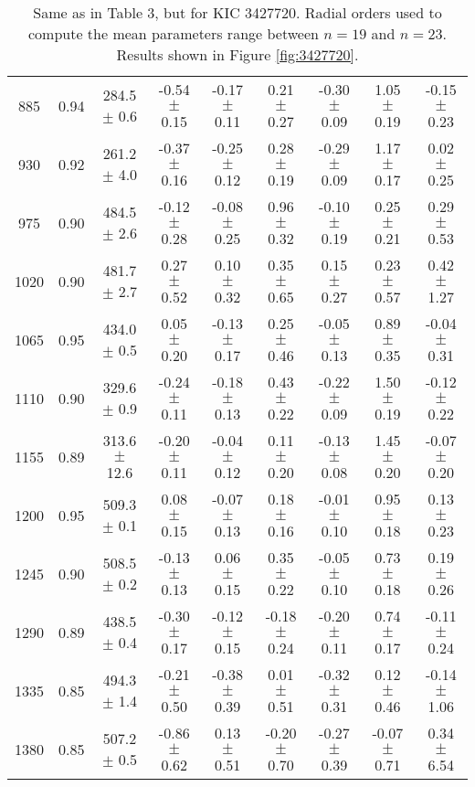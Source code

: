 \documentclass[twocolumn]{aastex61}%
\begin{document}
\begin{table*}[ht]
\begin{tabular}{ccc|ccccc|c}
885 & 0.94 & 284.5 $\pm$ 0.6 & -0.54 $\pm$ 0.15 & -0.17 $\pm$ 0.11 & 0.21 $\pm$ 0.27 & -0.30 $\pm$ 0.09 & 1.05 $\pm$ 0.19 & -0.15 $\pm$ 0.23\\
930 & 0.92 & 261.2 $\pm$ 4.0 & -0.37 $\pm$ 0.16 & -0.25 $\pm$ 0.12 & 0.28 $\pm$ 0.19 & -0.29 $\pm$ 0.09 & 1.17 $\pm$ 0.17 & 0.02 $\pm$ 0.25\\
975 & 0.90 & 484.5 $\pm$ 2.6 & -0.12 $\pm$ 0.28 & -0.08 $\pm$ 0.25 & 0.96 $\pm$ 0.32 & -0.10 $\pm$ 0.19 & 0.25 $\pm$ 0.21 & 0.29 $\pm$ 0.53\\
1020 & 0.90 & 481.7 $\pm$ 2.7 & 0.27 $\pm$ 0.52 & 0.10 $\pm$ 0.32 & 0.35 $\pm$ 0.65 & 0.15 $\pm$ 0.27 & 0.23 $\pm$ 0.57 & 0.42 $\pm$ 1.27\\
1065 & 0.95 & 434.0 $\pm$ 0.5 & 0.05 $\pm$ 0.20 & -0.13 $\pm$ 0.17 & 0.25 $\pm$ 0.46 & -0.05 $\pm$ 0.13 & 0.89 $\pm$ 0.35 & -0.04 $\pm$ 0.31\\
1110 & 0.90 & 329.6 $\pm$ 0.9 & -0.24 $\pm$ 0.11 & -0.18 $\pm$ 0.13 & 0.43 $\pm$ 0.22 & -0.22 $\pm$ 0.09 & 1.50 $\pm$ 0.19 & -0.12 $\pm$ 0.22\\
1155 & 0.89 & 313.6 $\pm$ 12.6 & -0.20 $\pm$ 0.11 & -0.04 $\pm$ 0.12 & 0.11 $\pm$ 0.20 & -0.13 $\pm$ 0.08 & 1.45 $\pm$ 0.20 & -0.07 $\pm$ 0.20\\
1200 & 0.95 & 509.3 $\pm$ 0.1 & 0.08 $\pm$ 0.15 & -0.07 $\pm$ 0.13 & 0.18 $\pm$ 0.16 & -0.01 $\pm$ 0.10 & 0.95 $\pm$ 0.18 & 0.13 $\pm$ 0.23\\
1245 & 0.90 & 508.5 $\pm$ 0.2 & -0.13 $\pm$ 0.13 & 0.06 $\pm$ 0.15 & 0.35 $\pm$ 0.22 & -0.05 $\pm$ 0.10 & 0.73 $\pm$ 0.18 & 0.19 $\pm$ 0.26\\
1290 & 0.89 & 438.5 $\pm$ 0.4 & -0.30 $\pm$ 0.17 & -0.12 $\pm$ 0.15 & -0.18 $\pm$ 0.24 & -0.20 $\pm$ 0.11 & 0.74 $\pm$ 0.17 & -0.11 $\pm$ 0.24\\
1335 & 0.85 & 494.3 $\pm$ 1.4 & -0.21 $\pm$ 0.50 & -0.38 $\pm$ 0.39 & 0.01 $\pm$ 0.51 & -0.32 $\pm$ 0.31 & 0.12 $\pm$ 0.46 & -0.14 $\pm$ 1.06\\
1380 & 0.85 & 507.2 $\pm$ 0.5 & -0.86 $\pm$ 0.62 & 0.13 $\pm$ 0.51 & -0.20 $\pm$ 0.70 & -0.27 $\pm$ 0.39 & -0.07 $\pm$ 0.71 & 0.34 $\pm$ 6.54\\
\end{tabular}
\caption{Same as in Table 3, but for KIC 3427720. Radial orders used to compute the mean parameters range between $n=19$ and $n=23$. Results shown in Figure \ref{fig:3427720}.}\label{tab:3427720}
\end{table*}
\end{document}
